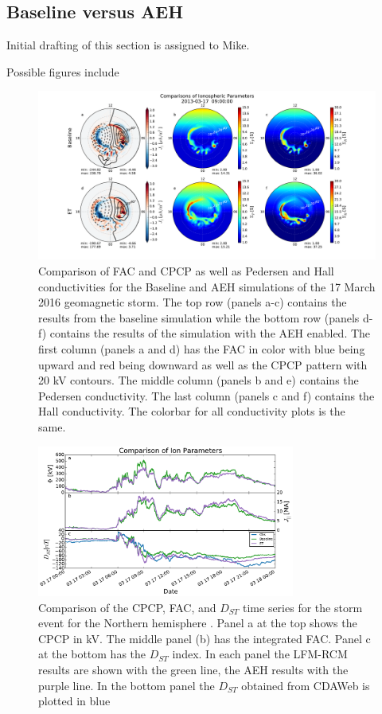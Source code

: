 \documentclass[draft,jgrga]{agutex}
\begin{document}
\begin{article}
\subsection{Baseline versus AEH}

Initial drafting of this section is assigned to Mike.

Possible figures include 

\begin{figure}[t]
\noindent\includegraphics[width=39pc]{JGRPaper-IonPatterns.pdf}
\caption{\label{ion-comp-fig}
Comparison of FAC and CPCP as well as Pedersen and Hall conductivities for the Baseline and AEH simulations of the 17 March 2016 geomagnetic storm.  The top row (panels a-c) contains the results from the baseline simulation while the bottom row (panels d-f) contains the results of the simulation with the AEH enabled.  The first column (panels a and d) has the FAC in color with blue being upward and red being downward as well as the CPCP pattern with 20 kV contours.  The middle column (panels b and e) contains the Pedersen conductivity.  The last column (panels c and f) contains the Hall conductivity.  The colorbar for all conductivity plots is the same.}
\end{figure}

\begin{figure}
\noindent\includegraphics[width=20pc]{JGRPaper-IonFig.pdf}
\caption{\label{ts-fig} 
Comparison of the CPCP, FAC, and $D_{ST}$ time series for the storm event for the Northern hemisphere .  Panel a at the top shows the CPCP in kV.  The middle panel (b) has the integrated  FAC.  Panel c at the bottom has the $D_{ST}$ index.  In each panel the LFM-RCM results are shown with the green line, the AEH results with the purple line.  In the bottom panel the $D_{ST}$ obtained from CDAWeb is plotted in blue} 
\end{figure}


\end{article}
\end{document}

